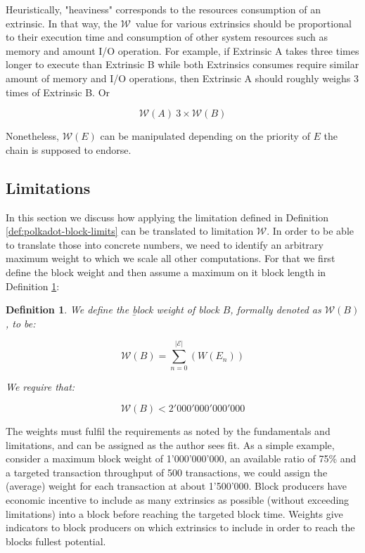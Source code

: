 \documentclass[11pt,a4paper]{article}
\newtheorem{definition}{Definition}
\newcommand{\TWF}{\ensuremath{\mathcal{W}}}
\begin{document}
Heuristically, "heaviness" corresponds to the resources consumption of an
extrinsic. In that way, the \TWF\ value for various extrinsics should be
proportional to their execution time and consumption of other system resources
such as memory and amount I/O operation. For example, if Extrinsic A takes three
times longer to execute than Extrinsic B while both Extrinsics consumes require
similar amount of memory and I/O operations, then Extrinsic A should roughly
weighs 3 times of Extrinsic B. Or

\[
\TWF(A)~3\times \TWF(B)
\]

Nonetheless, $\TWF(E)$ can be manipulated depending on the priority of $E$ the
chain is supposed to endorse.

\subsection{Limitations}\label{sec:limitations}

In this section we discuss how applying the limitation defined in Definition
\ref{def:polkadot-block-limits} can be translated to limitation $\TWF$. In order
to be able to translate those into concrete numbers, we need to identify an
arbitrary maximum weight to which we scale all other computations. For that we
first define the block weight and then assume a maximum on it block length in
Definition \ref{def:block-weight}:

\begin{definition}
  \label{def:block-weight} We define the {\b block weight} of block $B$,
  formally denoted as  $\TWF(B)$, to be:

  \[
    \TWF(B) = \sum^{|\mathcal{E}|}_{n = 0} (W(E_n))
  \]

  We require that:

  \[
    \TWF(B) < 2'000'000'000'000
  \]
\end{definition}

The weights must fulfil the requirements as noted by the fundamentals and
limitations, and can be assigned as the author sees fit. As a simple example,
consider a maximum block weight of 1'000'000'000, an available ratio of 75\% and
a targeted transaction throughput of 500 transactions, we could assign the
(average) weight for each transaction at about 1'500'000. Block producers have
economic incentive to include as many extrinsics as possible (without exceeding
limitations) into a block before reaching the targeted block time. Weights give
indicators to block producers on which extrinsics to include in order to reach
the blocks fullest potential.
\end{document}

